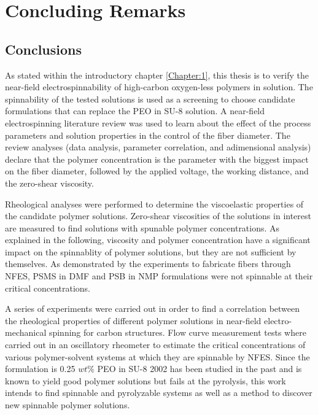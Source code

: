 
\chapter{Concluding Remarks} %

\label{Chapter:5}

\section{Conclusions}

As stated within the introductory chapter \ref{Chapter:1}, this thesis is to verify the near-field electrospinnability of high-carbon oxygen-less polymers in solution. The spinnability of the tested solutions is used as a screening to choose candidate formulations that can replace the PEO in SU-8 solution. A near-field electrospinning literature review was used to learn about the effect of the process parameters and solution properties in the control of the fiber diameter. The review analyses (data analysis, parameter correlation, and adimensional analysis) declare that the polymer concentration is the parameter with the biggest impact on the fiber diameter, followed by the applied voltage, the working distance, and the zero-shear viscosity.

Rheological analyses were performed to determine the viscoelastic properties of the candidate polymer solutions. Zero-shear viscosities of the solutions in interest are measured  to find solutions with spunable polymer concentrations. As explained in the following, viscosity and polymer concentration have a significant impact on the spinnablity of polymer solutions, but they are not sufficient by themselves. As demonstrated by the experiments to fabricate fibers through NFES, PSMS in DMF and PSB in NMP formulations were not spinnable at their critical concentrations.

A series of experiments were carried out in order to find a correlation between the rheological properties of different polymer solutions in near-field electro-mechanical spinning for carbon structures. Flow curve measurement tests where carried out in an oscillatory rheometer to estimate the critical concentrations of various polymer-solvent systems at which they are spinnable by NFES. Since the formulation is 0.25 $wt\%$ PEO in SU-8 2002 has been studied in the past and is known to yield good polymer solutions but fails at the pyrolysis, this work intends to find spinnable and pyrolyzable systems as well as a method to discover new spinnable polymer solutions.

